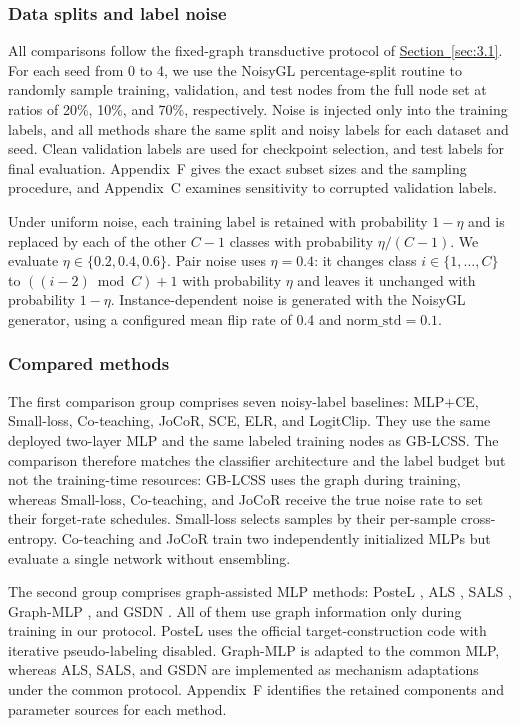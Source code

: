 \documentclass[10pt,letterpaper,nopreprintline]{elsarticle}
\theoremstyle{definition}
\theoremstyle{plain}
\begin{document}


\subsubsection{Data splits and label noise}\label{sec:4.1.2}

All comparisons follow the fixed-graph transductive protocol of \hyperref[sec:3.1]{Section~\ref*{sec:3.1}}. For each seed from 0 to 4, we use the NoisyGL percentage-split routine to randomly sample training, validation, and test nodes from the full node set at ratios of 20\%, 10\%, and 70\%, respectively. Noise is injected only into the training labels, and all methods share the same split and noisy labels for each dataset and seed. Clean validation labels are used for checkpoint selection, and test labels for final evaluation. Appendix~F gives the exact subset sizes and the sampling procedure, and Appendix~C examines sensitivity to corrupted validation labels.

Under uniform noise, each training label is retained with probability \(1-\eta\) and is replaced by each of the other \(C-1\) classes with probability \(\eta/(C-1)\). We evaluate \(\eta\in\{0.2,0.4,0.6\}\). Pair noise uses \(\eta=0.4\): it changes class \(i\in\{1,\ldots,C\}\) to \(((i-2)\bmod C)+1\) with probability \(\eta\) and leaves it unchanged with probability \(1-\eta\). Instance-dependent noise is generated with the NoisyGL generator, using a configured mean flip rate of 0.4 and \(\text{norm\_std}=0.1\).

\subsubsection{Compared methods}\label{sec:4.1.3}

The first comparison group comprises seven noisy-label baselines: MLP+CE, Small-loss, Co-teaching, JoCoR, SCE, ELR, and LogitClip. They use the same deployed two-layer MLP and the same labeled training nodes as GB-LCSS. The comparison therefore matches the classifier architecture and the label budget but not the training-time resources: GB-LCSS uses the graph during training, whereas Small-loss, Co-teaching, and JoCoR receive the true noise rate to set their forget-rate schedules. Small-loss selects samples by their per-sample cross-entropy. Co-teaching and JoCoR train two independently initialized MLPs but evaluate a single network without ensembling.

The second group comprises graph-assisted MLP methods: PosteL \cite{ref54}, ALS \cite{ref55}, SALS \cite{ref56}, Graph-MLP \cite{ref3}, and GSDN \cite{ref40}. All of them use graph information only during training in our protocol. PosteL uses the official target-construction code with iterative pseudo-labeling disabled. Graph-MLP is adapted to the common MLP, whereas ALS, SALS, and GSDN are implemented as mechanism adaptations under the common protocol. Appendix~F identifies the retained components and parameter sources for each method.
\end{document}
